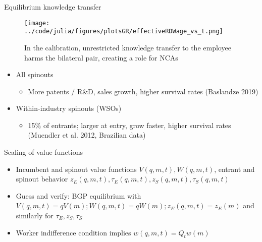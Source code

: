\documentclass[english,usenames,dvipsnames]{beamer}
\begin{document}
\begin{frame}{Equilibrium knowledge transfer}
\begin{figure}
	\texttt{[image: ../code/julia/figures/plotsGR/effectiveRDWage\_vs\_t.png]}
	\caption{In the calibration, unrestricted knowledge transfer to the employee harms the bilateral pair, creating a role for NCAs}
\end{figure}
\end{frame}



\appendix



\begin{frame}\label{spinouts_facts_from_literature}
\hyperlink{motivation_spillovers}{}
\begin{itemize}
	\item All spinouts
	\begin{itemize}
		\item More patents / R\&D, sales growth, higher survival rates (Baslandze 2019) 
	\end{itemize}
	\item Within-industry spinouts (WSOs)
	\begin{itemize}
		\item 15\% of entrants; larger at entry, grow faster, higher survival rates (Muendler et al. 2012, Brazilian data)
	\end{itemize}
\end{itemize}
\end{frame}


\begin{frame}{Scaling of value functions}\label{scaling_of_value_functions}
\hyperlink{closing_the_model}{}
\begin{itemize}
	\item Incumbent and spinout value functions $V(q,m,t),W(q,m,t)$, entrant and spinout behavior $z_E(q,m,t),\tau_E(q,m,t),z_S(q,m,t),\tau_S(q,m,t)$ 
	\item Guess and verify: BGP equilibrium with $V(q,m,t) = qV(m); W(q,m,t) = qW(m); z_E(q,m,t) = z_E(m)$ and similarly for $\tau_E,z_S,\tau_S$
	\item Worker indifference condition implies $w(q,m,t) = Q_t w(m)$ 
\end{itemize}
\end{frame}
\end{document}

